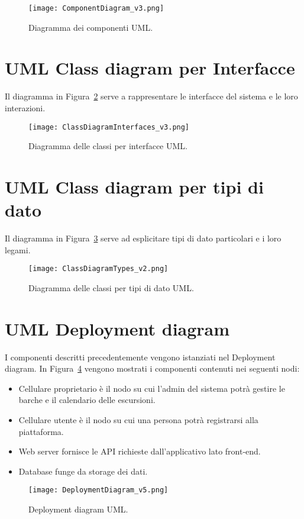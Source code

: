 \begin{figure}
    \centering
    \texttt{[image: ComponentDiagram\_v3.png]}
    \caption{Diagramma dei componenti UML.}\label{fig:componentDiagram}
\end{figure}

\newpage

\section{UML Class diagram per Interfacce}
Il diagramma in Figura~\ref{fig:ClassDiagramInterfaces} serve a rappresentare le interfacce del sistema e le loro interazioni.
\begin{figure}
    \centering
    \texttt{[image: ClassDiagramInterfaces\_v3.png]}
    \caption{Diagramma delle classi per interfacce UML.}\label{fig:ClassDiagramInterfaces}
\end{figure}

\newpage

\section{UML Class diagram per tipi di dato}
Il diagramma in Figura~\ref{fig:ClassDiagramTypes} serve ad esplicitare tipi di dato particolari e i loro legami.
\begin{figure}
    \centering
    \texttt{[image: ClassDiagramTypes\_v2.png]}
    \caption{Diagramma delle classi per tipi di dato UML.}\label{fig:ClassDiagramTypes}
\end{figure}

\section{UML Deployment diagram}
I componenti descritti precedentemente vengono istanziati nel Deployment diagram. In Figura~\ref{fig:DeploymentDiagram} vengono mostrati i componenti contenuti nei seguenti nodi:

\begin{itemize}
    \item Cellulare proprietario è il nodo su cui l'admin del sistema potrà gestire le barche e il calendario delle escursioni.
    \item Cellulare utente è il nodo su cui una persona potrà registrarsi alla piattaforma.
    \item Web server fornisce le API richieste dall'applicativo lato front-end.
    \item Database funge da storage dei dati.
\end{itemize}

\begin{figure}
    \centering
    \texttt{[image: DeploymentDiagram\_v5.png]}
    \caption{Deployment diagram UML.}\label{fig:DeploymentDiagram}
\end{figure}